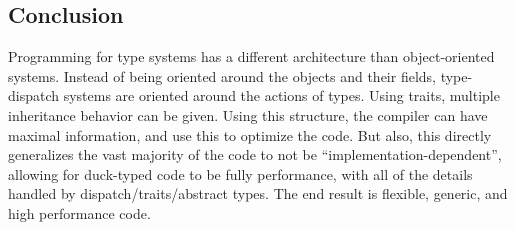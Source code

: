 \documentclass[11pt]{article}
\begin{document}
    \subsection{Conclusion}\label{conclusion}

Programming for type systems has a different architecture than
object-oriented systems. Instead of being oriented around the objects
and their fields, type-dispatch systems are oriented around the actions
of types. Using traits, multiple inheritance behavior can be given.
Using this structure, the compiler can have maximal information, and use
this to optimize the code. But also, this directly generalizes the vast
majority of the code to not be ``implementation-dependent'', allowing
for duck-typed code to be fully performance, with all of the details
handled by dispatch/traits/abstract types. The end result is flexible,
generic, and high performance code.


    
    
    
    
\end{document}
